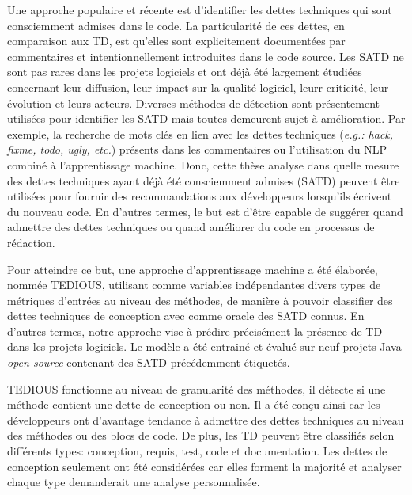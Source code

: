 Une approche populaire et r\'{e}cente est d'identifier les dettes techniques qui sont consciemment admises dans le code. La particularit\'{e} de ces dettes, en comparaison aux \ac{TD}, est qu'elles sont explicitement document\'{e}es par commentaires et intentionnellement introduites dans le code source. Les \ac{SATD} ne sont pas rares dans les projets logiciels et ont d\'{e}j\`{a} \'{e}t\'{e} largement \'{e}tudi\'{e}es concernant leur diffusion, leur impact sur la qualit\'{e} logiciel, leurr criticit\'{e}, leur \'{e}volution et leurs acteurs. Diverses m\'{e}thodes de d\'{e}tection sont pr\'{e}sentement utilis\'{e}es pour identifier les \ac{SATD} mais toutes demeurent sujet \`{a} am\'{e}lioration. Par exemple, la recherche de mots cl\'{e}s en lien avec les dettes techniques (\emph{e.g.: hack, fixme, todo, ugly, etc.}) pr\'{e}sents dans les commentaires ou l'utilisation du \ac{NLP} combin\'{e} \`{a} l'apprentissage machine. Donc, cette th\`{e}se analyse dans quelle mesure des dettes techniques ayant d\'{e}j\`{a} \'{e}t\'{e} consciemment admises (\ac{SATD}) peuvent \^{e}tre utilis\'{e}es pour fournir des recommandations aux d\'{e}veloppeurs lorsqu'ils \'{e}crivent du nouveau code. En d'autres termes, le but est d'\^{e}tre capable de sugg\'{e}rer quand admettre des dettes techniques ou quand am\'{e}liorer du code en processus de r\'{e}daction. \par

Pour atteindre ce but, une approche d'apprentissage machine a \'{e}t\'{e} \'{e}labor\'{e}e, nomm\'{e}e \ac{TEDIOUS}, utilisant comme variables ind\'{e}pendantes divers types de m\'{e}triques d'entr\'{e}es au niveau des m\'{e}thodes, de mani\`{e}re \`{a} pouvoir classifier des dettes techniques de conception avec comme oracle des \ac{SATD} connus. En d'autres termes, notre approche vise \`{a} pr\'{e}dire pr\'{e}cis\'{e}ment la pr\'{e}sence de \ac{TD} dans les projets logiciels. Le mod\`{e}le a \'{e}t\'{e} entrain\'{e} et \'{e}valu\'{e} sur neuf projets Java \emph{open source} contenant des \ac{SATD} pr\'{e}c\'{e}demment \'{e}tiquet\'{e}s. \par

\ac{TEDIOUS} fonctionne au niveau de granularit\'{e} des m\'{e}thodes, il d\'{e}tecte si une m\'{e}thode contient une dette de conception ou non. Il a \'{e}t\'{e} con\c{c}u ainsi car les d\'{e}veloppeurs ont d'avantage tendance \`{a} admettre des dettes techniques au niveau des m\'{e}thodes ou des blocs de code. De plus, les \ac{TD} peuvent \^{e}tre classifi\'{e}s selon diff\'{e}rents types: conception, requis, test, code et documentation. Les dettes de conception seulement ont \'{e}t\'{e} consid\'{e}r\'{e}es car elles forment la majorit\'{e} et analyser chaque type demanderait une analyse personnalis\'{e}e. \par

